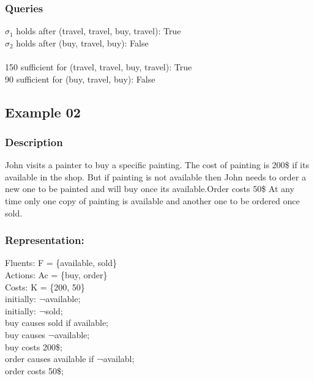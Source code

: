 \documentclass[11pt]{article}
\begin{document}
	\subsubsection{Queries}
	$\sigma_{1}$ holds after (travel, travel, buy, travel): True\\
	$\sigma_{2}$ holds after (buy, travel, buy): False\\
	\\
	150 sufficient for (travel, travel, buy, travel): True\\
	90 sufficient for (buy, travel, buy): False\\
	\subsection{Example 02}\label{example:ex02}
	\subsubsection{Description}\label{par:p102}
	John visits a painter to buy a specific painting. The cost of painting is 200\$ if its available in the shop. But if painting is not available then John needs to order a new one to be painted and will buy once its available.Order costs 50\$ At any time only one copy of painting is available and another one to be ordered once sold. 
	
	\subsubsection{Representation:}\label{par:p202}
	\indent 
	Fluents: F = \{available, sold\}\\
	Actions: Ac = \{buy, order\}\\
	Costs: K = \{200, 50\}\\
	initially: ¬available;\\
	initially: ¬sold;\\
	buy causes sold if available;\\
	buy causes ¬available;\\
	buy costs 200\$;\\
	order causes available if ¬availabl;\\
	order costs 50\$; \\
	
\end{document}

